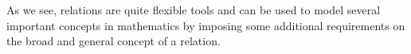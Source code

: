 \medskip
As we see, relations are quite flexible tools and can be used to model several important concepts in mathematics by imposing some additional requirements on the broad and general concept of a relation.







